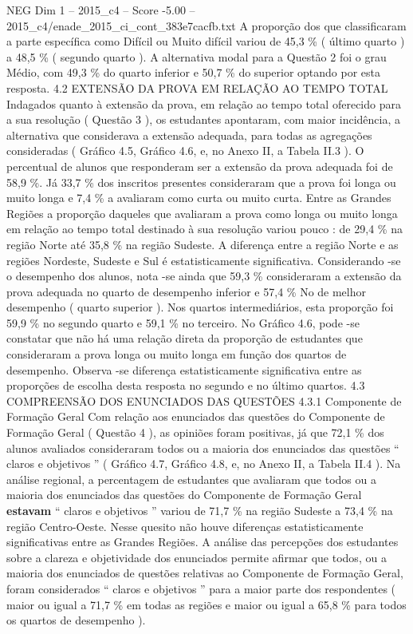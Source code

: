 \begin{textsample}{NEG Dim 1 – 2015\_c4 – Score -5.00 – 2015\_c4/enade\_2015\_ci\_cont\_383e7cacfb.txt}
A proporção dos que classificaram a parte específica como Difícil ou Muito difícil variou de 45,3 \% ( último quarto ) a 48,5 \% ( segundo quarto ).
A alternativa modal para a Questão 2 foi o grau Médio, com 49,3 \% do quarto inferior e 50,7 \% do superior optando por esta resposta. 4.2 EXTENSÃO DA PROVA EM RELAÇÃO AO TEMPO TOTAL Indagados quanto à extensão da prova, em relação ao tempo total oferecido para a sua resolução ( Questão 3 ), os estudantes apontaram, com maior incidência, a alternativa que considerava a extensão adequada, para todas as agregações consideradas ( Gráfico 4.5, Gráfico 4.6, e, no Anexo II, a Tabela II.3 ).
O percentual de alunos que responderam ser a extensão da prova adequada foi de 58,9 \%.
Já 33,7 \% dos inscritos presentes consideraram que a prova foi longa ou muito longa e 7,4 \% a avaliaram como curta ou muito curta.
Entre as Grandes Regiões a proporção daqueles que avaliaram a prova como longa ou muito longa em relação ao tempo total destinado à sua resolução variou pouco : de 29,4 \% na região Norte até 35,8 \% na região Sudeste.
A diferença entre a região Norte e as regiões Nordeste, Sudeste e Sul é estatisticamente significativa.
Considerando -se o desempenho dos alunos, nota -se ainda que 59,3 \% consideraram a extensão da prova adequada no quarto de desempenho inferior e 57,4 \% No de melhor desempenho ( quarto superior ).
Nos quartos intermediários, esta proporção foi 59,9 \% no segundo quarto e 59,1 \% no terceiro.
No Gráfico 4.6, pode -se constatar que não há uma relação direta da proporção de estudantes que consideraram a prova longa ou muito longa em função dos quartos de desempenho.
Observa -se diferença estatisticamente significativa entre as proporções de escolha desta resposta no segundo e no último quartos. 4.3 COMPREENSÃO DOS ENUNCIADOS DAS QUESTÕES 4.3.1 Componente de Formação Geral Com relação aos enunciados das questões do Componente de Formação Geral ( Questão 4 ), as opiniões foram positivas, já que 72,1 \% dos alunos avaliados consideraram todos ou a maioria dos enunciados das questões “ claros e objetivos ” ( Gráfico 4.7, Gráfico 4.8, e, no Anexo II, a Tabela II.4 ).
Na análise regional, a percentagem de estudantes que avaliaram que todos ou a maioria dos enunciados das questões do Componente de Formação Geral \textbf{estavam} “ claros e objetivos ” variou de 71,7 \% na região Sudeste a 73,4 \% na região Centro-Oeste.
Nesse quesito não houve diferenças estatisticamente significativas entre as Grandes Regiões.
A análise das percepções dos estudantes sobre a clareza e objetividade dos enunciados permite afirmar que todos, ou a maioria dos enunciados de questões relativas ao Componente de Formação Geral, foram considerados “ claros e objetivos ” para a maior parte dos respondentes ( maior ou igual a 71,7 \% em todas as regiões e maior ou igual a 65,8 \% para todos os quartos de desempenho ).

\end{textsample}
